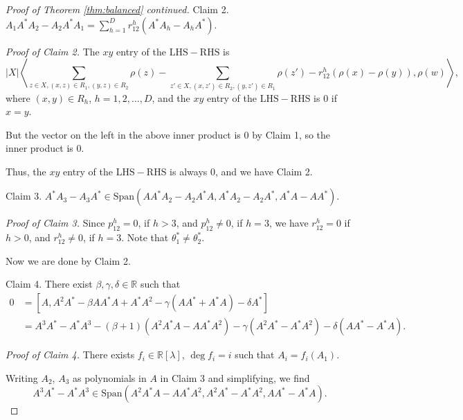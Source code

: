 \documentclass[
]{book}
\theoremstyle{definition}
\theoremstyle{definition}
\theoremstyle{definition}
\theoremstyle{definition}
\theoremstyle{remark}
\begin{document}
\begin{proof}[Proof of Theorem \ref{thm:balanced} continued]
Claim 2.
\({\displaystyle A_1A^*A_2 - A_2A^*A_1 = \sum_{h=1}^D r^h_{12}(A^*A_h - A_hA^*).}\)

\emph{Proof of Claim 2.}
The \(xy\) entry of the \(\mathrm{LHS} - \mathrm{RHS}\) is
\[|X|\left\langle \sum_{z\in X, (x,z)\in R_1, (y,z)\in R_2}\rho(z) - \sum_{z'\in X, (x,z')\in R_2, (y,z')\in R_1}\rho(z') - r^h_{12}(\rho(x)-\rho(y)),\rho(w)\right\rangle,\]
where \((x,y)\in R_h\), \(h = 1, 2, \ldots, D\), and the \(xy\) entry of the \(\mathrm{LHS} - \mathrm{RHS}\) is \(0\) if \(x = y\).

But the vector on the left in the above inner product is \(0\) by Claim 1, so the inner product is \(0\).

Thus, the \(xy\) entry of the \(\mathrm{LHS} - \mathrm{RHS}\) is always \(0\), and we have Claim 2.

Claim 3. \(A^*A_3 - A_3A^* \in \mathrm{Span}(AA^*A_2 - A_2A^*A, A^*A_2 - A_2A^*, A^*A-AA^*).\)

\emph{Proof of Claim 3.}
Since \(p^h_{12} = 0\), if \(h>3\), and \(p^h_{12} \neq 0\), if \(h=3\), we have \(r^h_{12} = 0\) if \(h > 0\), and \(r^h_{12} \neq 0\), if \(h = 3\). Note that \(\theta^*_1\neq \theta^*_2\).

Now we are done by Claim 2.

Claim 4. There exist \(\beta, \gamma, \delta\in \mathbb{R}\) such that
\begin{align}
0 & = [A, A^2A^*-\beta AA^*A + A^*A^2 - \gamma(AA^*+A^*A) - \delta A^*]\\
& = A^3A^* - A^*A^3 - (\beta+1)(A^2A^*A-AA^*A^2)-\gamma(A^2A^*-A^*A^2)-\delta(AA^*-A^*A).
\end{align}

\emph{Proof of Claim 4.}
There exists \(f_i\in \mathbb{R}[\lambda]\), \(\deg f_i = i\) such that \(A_i = f_i(A_1)\).

Writing \(A_2\), \(A_3\) as polynomials in \(A\) in Claim 3 and simplifying, we find
\[A^3A^*-A^*A^3 \in \mathrm{Span}(A^2A^*A-AA^*A^2, A^2A^*-A^*A^2, AA^*-A^*A).\]


\end{proof}
\end{document}
